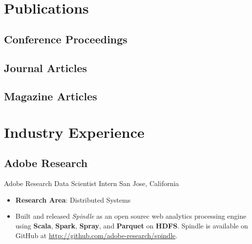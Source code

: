 \documentclass[11pt,letter,sans]{moderncv}
\begin{document}
\section{ Publications }


  \nocite{*}

  \subsection{Conference Proceedings}
  \printbibliography[heading=none,type=inproceedings,
    prefixnumbers=C]

  \subsection{Journal Articles}
  \printbibliography[heading=none,type=article,keyword=journal,
    resetnumbers=true,prefixnumbers=J]

  \subsection{Magazine Articles}
  \printbibliography[heading=none,type=article,keyword=magazine,
    resetnumbers=true,prefixnumbers=M]
\section{ Industry Experience }


  
    \subsection{Adobe Research}
      {Adobe Research}%
      {Data Scientist Intern}%
      {San Jose, California}%
      {}%
      {
        \begin{itemize}
        \item {\bf Research Area}: Distributed Systems\item Built and released {\it Spindle} as an open sourec web analytics processing engine using {\bf Scala}, {\bf Spark}, {\bf Spray}, and {\bf Parquet} on {\bf HDFS}. Spindle is available on GitHub at \url{http://github.com/adobe-research/spindle}.\end{itemize}
      }
  
\end{document}
